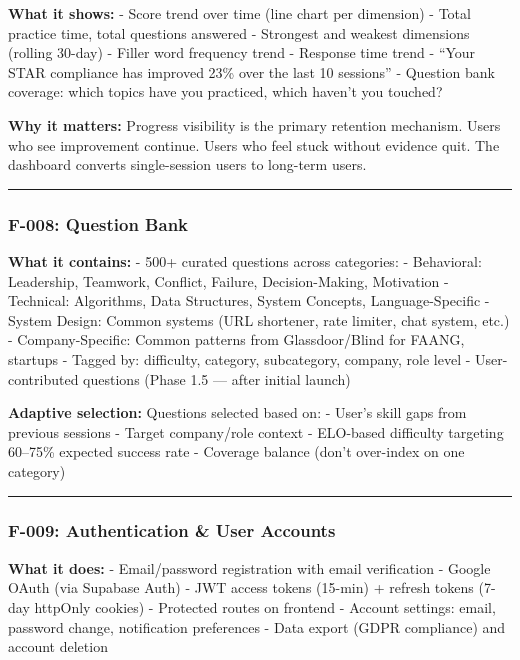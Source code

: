 \documentclass[
  11pt,
]{article}
\begin{document}
\textbf{What it shows:} - Score trend over time (line chart per
dimension) - Total practice time, total questions answered - Strongest
and weakest dimensions (rolling 30-day) - Filler word frequency trend -
Response time trend - ``Your STAR compliance has improved 23\% over the
last 10 sessions'' - Question bank coverage: which topics have you
practiced, which haven't you touched?

\textbf{Why it matters:} Progress visibility is the primary retention
mechanism. Users who see improvement continue. Users who feel stuck
without evidence quit. The dashboard converts single-session users to
long-term users.

\begin{center}\rule{0.5\linewidth}{0.5pt}\end{center}

\hypertarget{f-008-question-bank}{%
\subsubsection{F-008: Question Bank}\label{f-008-question-bank}}

\textbf{What it contains:} - 500+ curated questions across categories: -
Behavioral: Leadership, Teamwork, Conflict, Failure, Decision-Making,
Motivation - Technical: Algorithms, Data Structures, System Concepts,
Language-Specific - System Design: Common systems (URL shortener, rate
limiter, chat system, etc.) - Company-Specific: Common patterns from
Glassdoor/Blind for FAANG, startups - Tagged by: difficulty, category,
subcategory, company, role level - User-contributed questions (Phase 1.5
--- after initial launch)

\textbf{Adaptive selection:} Questions selected based on: - User's skill
gaps from previous sessions - Target company/role context - ELO-based
difficulty targeting 60--75\% expected success rate - Coverage balance
(don't over-index on one category)

\begin{center}\rule{0.5\linewidth}{0.5pt}\end{center}

\hypertarget{f-009-authentication-user-accounts}{%
\subsubsection{F-009: Authentication \& User
Accounts}\label{f-009-authentication-user-accounts}}

\textbf{What it does:} - Email/password registration with email
verification - Google OAuth (via Supabase Auth) - JWT access tokens
(15-min) + refresh tokens (7-day httpOnly cookies) - Protected routes on
frontend - Account settings: email, password change, notification
preferences - Data export (GDPR compliance) and account deletion
\end{document}
